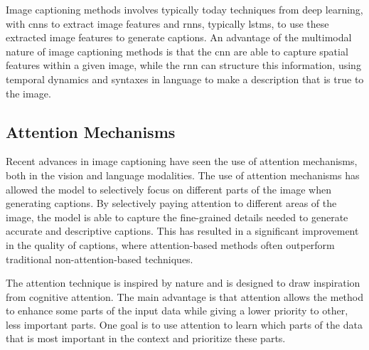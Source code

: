     Image captioning methods involves typically today techniques from deep learning, with \glspl{cnn} to extract image features and \glspl{rnn}, typically \glspl{lstm}, to use these extracted image features to generate captions. An advantage of the multimodal nature of image captioning methods is that the \gls{cnn} are able to capture spatial features within a given image, while the \gls{rnn} can structure this information, using temporal dynamics and syntaxes in language to make a description that is true to the image. 


    \subsection{Attention Mechanisms}
    Recent advances in image captioning have seen the use of attention mechanisms, both in the vision and language modalities. The use of attention mechanisms has allowed the model to selectively focus on different parts of the image when generating captions. By selectively paying attention to different areas of the image, the model is able to capture the fine-grained details needed to generate accurate and descriptive captions. This has resulted in a significant improvement in the quality of captions, where attention-based methods often outperform traditional non-attention-based techniques. 
    
    The attention technique is inspired by nature and is designed to draw inspiration from cognitive attention. The main advantage is that attention allows the method to enhance some parts of the input data while giving a lower priority to other, less important parts. One goal is to use attention to learn which parts of the data that is most important in the context and prioritize these parts.  



